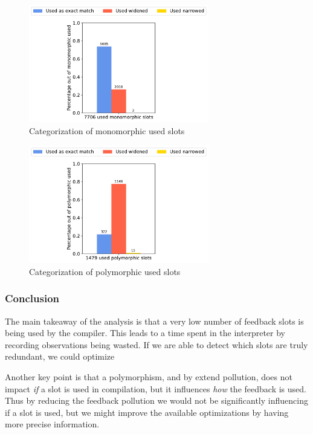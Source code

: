 \begin{figure}[t]
	\centering
	\includegraphics[width=0.7\textwidth]{figures/used_monomorphic.pdf}
	\caption{Categorization of monomorphic used slots}\label{fig:graph-used-mono}
\end{figure}

\begin{figure}[t]
	\centering
	\includegraphics[width=0.7\textwidth]{figures/used_polymorphic.pdf}
	\caption{Categorization of polymorphic used slots}\label{fig:graph-used-poly}
\end{figure}

\subsubsection*{Conclusion}

The main takeaway of the analysis is that a very low number of feedback slots is being used by the compiler. This leads to a time spent in the interpreter by recording observations being wasted. If we are able to detect which slots are truly redundant, we could optimize

Another key point is that a polymorphism, and by extend pollution, does not impact \textit{if} a slot is used in compilation, but it influences \textit{how} the feedback is used. Thus by reducing the feedback pollution we would not be significantly influencing if a slot is used, but we might improve the available optimizations by having more precise information.

